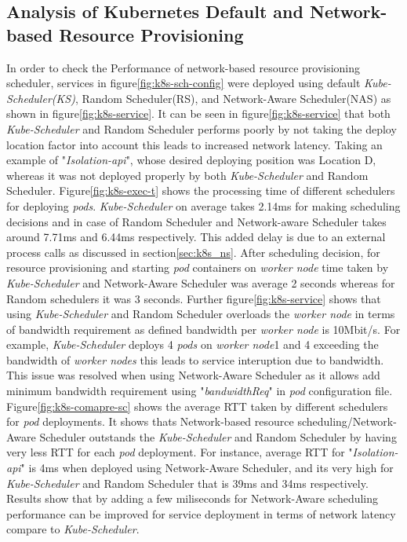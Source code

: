 \subsection{Analysis of Kubernetes Default and Network-based Resource Provisioning}
\label{sec:analysis}
In order to check the Performance of network-based resource provisioning scheduler, services in figure\ref{fig:k8s-sch-config} were deployed using default \emph{Kube-Scheduler(KS)}, Random Scheduler(RS), and Network-Aware Scheduler(NAS) as shown in figure\ref{fig:k8s-service}\cite{Santos2019}. It can be seen in figure\ref{fig:k8s-service} that both \emph{Kube-Scheduler} and Random Scheduler performs poorly by not taking the deploy location factor into account this leads to increased network latency\cite{Santos2019}. Taking an example of "\emph{Isolation-api}", whose desired deploying position was Location D, whereas it was not deployed properly by both \emph{Kube-Scheduler} and Random Scheduler\cite{Santos2019}. Figure\ref{fig:k8s-exec-t} shows the processing time of different schedulers for deploying \emph{pods}. \emph{Kube-Scheduler} on average takes 2.14ms for making scheduling decisions and in case of Random Scheduler and Network-aware Scheduler takes around 7.71ms and 6.44ms respectively\cite{Santos2019}. This added delay is due to an external process calls as discussed in section\ref{sec:k8s_ns}. After scheduling decision, for resource provisioning and starting \emph{pod} containers on \emph{worker node} time taken by \emph{Kube-Scheduler} and Network-Aware Scheduler was average 2 seconds whereas for Random schedulers it was 3 seconds\cite{Santos2019}. Further figure\ref{fig:k8s-service} shows that using \emph{Kube-Scheduler} and Random Scheduler overloads the \emph{worker node} in terms of bandwidth requirement as defined bandwidth per \emph{worker node} is 10Mbit/s\cite{Santos2019}. For example, \emph{Kube-Scheduler} deploys 4 \emph{pods} on \emph{worker node}1 and 4 exceeding the bandwidth of \emph{worker nodes} this leads to service interuption due to bandwidth\cite{Santos2019}. This issue was resolved when using Network-Aware Scheduler as it allows add minimum bandwidth requirement using "\emph{bandwidthReq}" in \emph{pod} configuration file\cite{Santos2019}. Figure\ref{fig:k8s-comapre-sc} shows the average RTT taken by different schedulers for \emph{pod} deployments. It shows thats Network-based resource scheduling/Network-Aware Scheduler outstands the \emph{Kube-Scheduler} and Random Scheduler by having very less RTT for each \emph{pod} deployment\cite{Santos2019}. For instance, average RTT for "\emph{Isolation-api}" is 4ms when deployed using Network-Aware Scheduler, and its very high for \emph{Kube-Scheduler} and Random Scheduler that is 39ms and 34ms respectively\cite{Santos2019}. Results show that by adding a few miliseconds for Network-Aware scheduling performance can be improved for service deployment in terms of network latency compare to \emph{Kube-Scheduler}\cite{Santos2019}.
